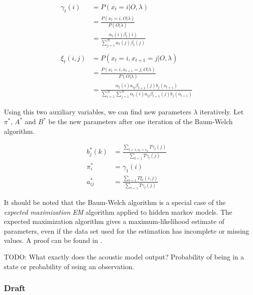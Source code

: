 \begin{align*}
\gamma_t(i) &= P(x_t = i|O,\lambda) \\
&= \frac{P(x_t = i, O|\lambda)}{P(O|\lambda)} \\
&=\frac{\alpha_t(i)\beta_t(i)}{\sum_{j = 1}^{N} \alpha_t(j) \beta_t(j)}  \\ \\ 
\xi_t(i, j) &= P(x_t = i,x_{t + 1} = j|O,\lambda) \\
&= \frac{P(x_t = i,x_{t + 1} = j, O|\lambda)}{P(O|\lambda)} \\
&=\frac{\alpha_t(i)a_{ij}\beta_{t + 1}(j)b_j(o_{t + 1})}{\sum_{i = 1}^{N} \sum_{j = 1}^{N} \alpha_t(i)a_{ij}\beta_{t + 1}(j)b_j(o_{t + 1})}
\end{align*}

Using this two auxiliary variables, we can find new parameters $\lambda$ iteratively. Let $\pi^*$, $A^*$ and $B^*$ be the new parameters after one iteration of the Baum-Welch algorithm. 

\begin{align*}
b^*_j(k) &= \frac{\sum_{t = 1, o_t = v_k}{T} \gamma_t(j)}{\sum_{t = 1}{T} \gamma_t(j)} \\
\pi^*_i &= \gamma_1(i) \\
a_{ij}^*  &= \frac{\sum_{t = 1}{T} \xi_t(i, j)}{\sum_{t = 1}{T} \gamma_t(j)} 
\end{align*}

It should be noted that the Baum-Welch algorithm is a special case of the \textit{expected maximization} {\textit{EM}} algorithm applied to hidden markov models. The expected maximization algorithm gives a maximum-likelihood estimate of parameters, even if the data set used for the estimation has incomplete or missing values. A proof can be found in \cite{bilmes1998gentle}. 


TODO: What exactly does the acoustic model output? Probability of being in a state or probability of seing an observation. 
\subsubsection{Draft}

